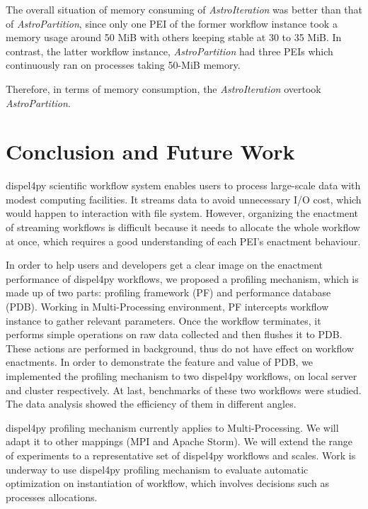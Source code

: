 \documentclass[10pt,twoside,openright,logo]{report}
\begin{document}
The overall situation of memory consuming of \textit{AstroIteration} was better than that of \textit{AstroPartition}, since only one PEI of the former workflow instance took a memory usage around 50 MiB with others keeping stable at 30 to 35 MiB. In contrast, the latter workflow instance, \textit{AstroPartition} had three PEIs which continuously ran on processes taking 50-MiB memory.

Therefore, in terms of memory consumption, the \textit{AstroIteration} overtook \textit{AstroPartition}.


\chapter{Conclusion and Future Work}
dispel4py scientific workflow system enables users to process large-scale data with modest computing facilities. It streams data to avoid unnecessary I/O cost, which would happen to interaction with file system. However, organizing the enactment of streaming workflows is difficult because it needs to allocate the whole workflow at once, which requires a good understanding of each PEI's enactment behaviour.

In order to help users and developers get a clear image on the enactment performance of dispel4py workflows, we proposed a profiling mechanism, which is made up of two parts: profiling framework (PF) and performance database (PDB). Working in Multi-Processing environment, PF intercepts workflow instance to gather relevant parameters. Once the workflow terminates, it performs simple operations on raw data collected and then flushes it to PDB. These actions are performed in background, thus do not have effect on workflow enactments. In order to demonstrate the feature and value of PDB, we implemented the profiling mechanism to two dispel4py workflows, on local server and cluster respectively. At last, benchmarks of these two workflows were studied. The data analysis showed the efficiency of them in different angles.

dispel4py profiling mechanism currently applies to Multi-Processing. We will adapt it to other mappings (MPI and Apache Storm). We will extend the range of experiments to a representative set of dispel4py workflows and scales. Work is underway to use dispel4py profiling mechanism to evaluate automatic optimization on instantiation of workflow, which involves decisions such as processes allocations.
\end{document}
